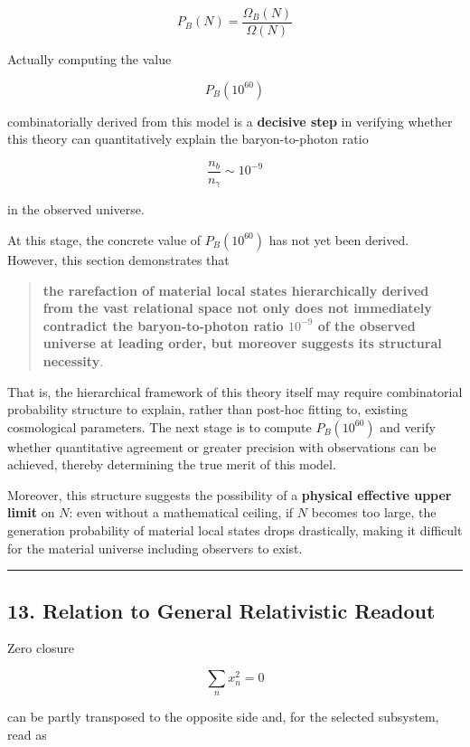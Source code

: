 \documentclass[
  a4paper,
]{article}
\begin{document}
\[
P_B(N)
=
\frac{\Omega_B(N)}{\Omega(N)}
\tag{24}
\]

Actually computing the value

\[
P_B(10^{60})
\]

combinatorially derived from this model is a \textbf{decisive step} in
verifying whether this theory can quantitatively explain the
baryon-to-photon ratio

\[
\frac{n_b}{n_\gamma}
\sim10^{-9}
\]

in the observed universe.

At this stage, the concrete value of \(P_B(10^{60})\) has not yet been
derived. However, this section demonstrates that

\begin{quote}
\textbf{the rarefaction of material local states hierarchically derived
from the vast relational space not only does not immediately contradict
the baryon-to-photon ratio \(10^{-9}\) of the observed universe at
leading order, but moreover suggests its structural necessity}.
\end{quote}

That is, the hierarchical framework of this theory itself may require
combinatorial probability structure to explain, rather than post-hoc
fitting to, existing cosmological parameters. The next stage is to
compute \(P_B(10^{60})\) and verify whether quantitative agreement or
greater precision with observations can be achieved, thereby determining
the true merit of this model.

Moreover, this structure suggests the possibility of a \textbf{physical
effective upper limit} on \(N\): even without a mathematical ceiling, if
\(N\) becomes too large, the generation probability of material local
states drops drastically, making it difficult for the material universe
including observers to exist.

\begin{center}\rule{0.5\linewidth}{0.5pt}\end{center}

\subsection{13. Relation to General Relativistic
Readout}\label{relation-to-general-relativistic-readout}

Zero closure

\[
\sum_nx_n^2=0
\]

can be partly transposed to the opposite side and, for the selected
subsystem, read as
\end{document}
